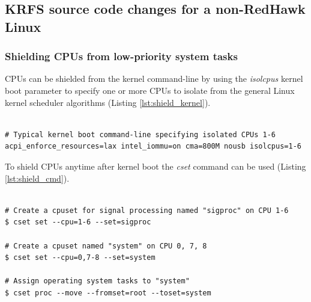 \documentclass[12pt]{article}
\begin{document}
\subsection{KRFS source code changes for a non-RedHawk Linux}

\subsubsection{Shielding CPUs from low-priority system tasks}

CPUs can be shielded from the kernel command-line by using the \emph{isolcpus}
kernel boot parameter to specify one or more CPUs to isolate from the general
Linux kernel scheduler algorithms (Listing \ref{lst:shield_kernel}).


\lstset{
    language=bash,
    basicstyle=\footnotesize\ttfamily,
    linewidth=7in,
    showstringspaces=false,
    keywordstyle=\ttfamily
}
\begin{adjustwidth}{0.0in}{0.0in}
\begin{lstlisting}[caption={Shielding CPUs at at kernel boot command-line},
label={lst:shield_kernel}]

# Typical kernel boot command-line specifying isolated CPUs 1-6
acpi_enforce_resources=lax intel_iommu=on cma=800M nousb isolcpus=1-6

\end{lstlisting}
\end{adjustwidth}

To shield CPUs anytime after kernel boot the \emph{cset} command can be used
(Listing \ref{lst:shield_cmd}).

\lstset{
    language=bash,
    basicstyle=\footnotesize\ttfamily,
    linewidth=7in,
    showstringspaces=false,
    keywordstyle=\ttfamily
}
\begin{adjustwidth}{0.0in}{0.0in}
\begin{lstlisting}[caption={Shielding CPUs at command-line},
label={lst:shield_cmd}]

# Create a cpuset for signal processing named "sigproc" on CPU 1-6
$ cset set --cpu=1-6 --set=sigproc

# Create a cpuset named "system" on CPU 0, 7, 8
$ cset set --cpu=0,7-8 --set=system

# Assign operating system tasks to "system"
$ cset proc --move --fromset=root --toset=system

\end{lstlisting}
\end{adjustwidth}
\end{document}
